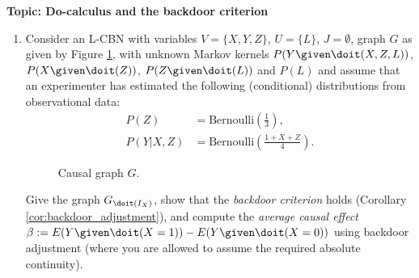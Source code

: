 

\flushleft\textbf{Topic: Do-calculus and the backdoor criterion}

\begin{enumerate}[label=8.\arabic*]
    \item Consider an L-CBN with variables $V=\{X, Y, Z\}$, $U=\{L\}$, $J=\emptyset$, graph $G$ as given by Figure \ref{fig:one}, with unknown Markov kernels $P(Y\given \doit(X, Z, L))$, $P(X\given \doit(Z))$, $P(Z\given \doit(L))$ and $P(L)$ and assume that an experimenter has estimated the following (conditional) distributions from observational data:
    \begin{align*}
        P(Z)      & = \mathrm{Bernoulli}\left(\frac{1}{3}\right),     \\
        P(Y|X, Z) & = \mathrm{Bernoulli}\left(\frac{1+X+Z}{4}\right).
    \end{align*}
    \begin{figure}[ht]
        \centering
        \caption{Causal graph $G$.}
        \label{fig:one}
    \end{figure}

    Give the graph $G_{\doit(I_X)}$, show that the \emph{backdoor criterion} holds (Corollary \ref{cor:backdoor_adjustment}), and compute the \emph{average causal effect} $\beta := E(Y \given \doit(X=1)) - E(Y \given \doit(X=0))$ using backdoor adjustment (where you are allowed to assume the required absolute continuity).


\end{enumerate}

